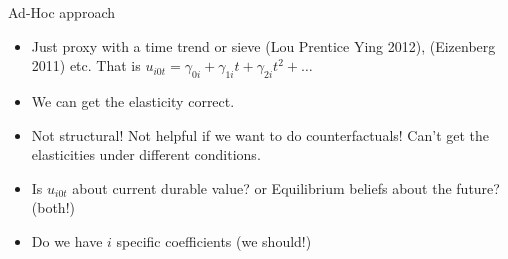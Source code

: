 \documentclass[aspectratio=169,11pt]{beamer}
\begin{document}
\begin{frame}{Ad-Hoc approach}
\begin{itemize}
\item  Just proxy with a time trend or sieve (Lou Prentice Ying 2012), (Eizenberg 2011) etc.  That is $u_{i0t} = \gamma_{0i} + \gamma_{1i} t + \gamma_{2i} t^2 + \ldots$
\item We can get the elasticity correct.
\item Not structural! Not helpful if we want to do counterfactuals! Can't get the elasticities under different conditions.
\item Is $u_{i0t}$ about current durable value? or Equilibrium beliefs about the future? (both!)
\item Do we have $i$ specific coefficients (we should!)
\end{itemize}
\end{frame}
\end{document}
